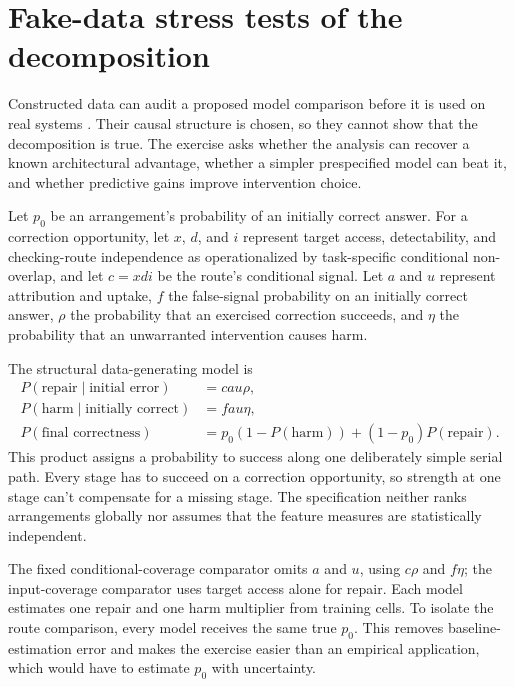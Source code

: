 \documentclass[12pt]{article}
\begin{document}
\section{Fake-data stress tests of the decomposition}

Constructed data can audit a proposed model comparison before it is used on real systems
\citep{gelman2020bayesianworkflow}. Their causal structure is chosen, so they cannot show
that the decomposition is true. The exercise asks whether the analysis can recover a known
architectural advantage, whether a simpler prespecified model can beat it, and whether
predictive gains improve intervention choice.

Let $p_0$ be an arrangement's probability of an initially correct answer. For a correction
opportunity, let $x$, $d$, and $i$ represent target access, detectability, and checking-route
independence as operationalized by task-specific conditional non-overlap, and let $c=xdi$ be
the route's conditional signal. Let $a$ and $u$ represent attribution and uptake, $f$ the
false-signal probability on an initially correct answer, $\rho$ the probability that an
exercised correction succeeds, and $\eta$ the probability that an unwarranted intervention
causes harm.

The structural data-generating model is
\begin{align*}
 P(\text{repair}\mid\text{initial error}) &= c a u \rho, \\
 P(\text{harm}\mid\text{initially correct}) &= f a u \eta, \\
 P(\text{final correctness}) &= p_0(1-P(\text{harm}))
 +(1-p_0)P(\text{repair}).
\end{align*}
This product assigns a probability to success along one deliberately simple serial path.
Every stage has to succeed on a correction opportunity, so strength at one stage can't
compensate for a missing stage. The specification neither ranks arrangements globally nor
assumes that the feature measures are statistically independent.

The fixed conditional-coverage comparator omits $a$ and $u$, using $c\rho$ and $f\eta$;
the input-coverage comparator uses target access alone for repair. Each model estimates one
repair and one harm multiplier from training cells. To isolate the route comparison, every
model receives the same true $p_0$. This removes baseline-estimation error and makes the
exercise easier than an empirical application, which would have to estimate $p_0$ with
uncertainty.
\end{document}

